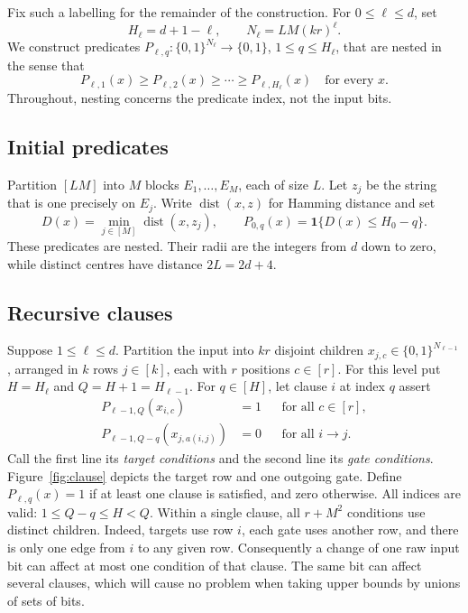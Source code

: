 \documentclass[11pt]{article}
\theoremstyle{definition}
\theoremstyle{remark}
\begin{document}
Fix such a labelling for the remainder of the construction.
For \(0\le\ell\le d\), set
\[
 H_\ell=d+1-\ell,\qquad N_\ell=LM(kr)^\ell.
\]
We construct predicates \(P_{\ell,q}:\{0,1\}^{N_\ell}\to\{0,1\}\),
\(1\le q\le H_\ell\), that are nested in the sense that
\[
 P_{\ell,1}(x)\ge P_{\ell,2}(x)\ge\cdots
 \ge P_{\ell,H_\ell}(x)\quad\text{for every }x.
\]
Throughout, nesting concerns the predicate index, not the input bits.

\subsection{Initial predicates}
Partition \([LM]\) into \(M\) blocks \(E_1,\ldots,E_M\), each of
size \(L\). Let \(z_j\) be the string that is one precisely on \(E_j\).
Write \(\operatorname{dist}(x,z)\) for Hamming distance and set
\[
 D(x)=\min_{j\in[M]}\operatorname{dist}(x,z_j),\qquad
 P_{0,q}(x)=\mathbf1\{D(x)\le H_0-q\}.
\]
These predicates are nested. Their radii are the integers from \(d\)
down to zero, while distinct centres have distance \(2L=2d+4\).

\subsection{Recursive clauses}
Suppose \(1\le\ell\le d\). Partition the input into \(kr\) disjoint
children \(x_{j,c}\in\{0,1\}^{N_{\ell-1}}\), arranged in \(k\) rows
\(j\in[k]\), each with \(r\) positions \(c\in[r]\).
For this level put \(H=H_\ell\) and \(Q=H+1=H_{\ell-1}\).
For \(q\in[H]\), let clause \(i\) at index \(q\) assert
\begin{equation}\label{eq:predicate-definition}
 \begin{aligned}
 P_{\ell-1,Q}(x_{i,c})&=1 &&\text{for all }c\in[r],\\
 P_{\ell-1,Q-q}(x_{j,a(i,j)})&=0 &&\text{for all }i\to j.
 \end{aligned}
\end{equation}
Call the first line its \emph{target conditions} and the second line
its \emph{gate conditions}. Figure~\ref{fig:clause} depicts the target row
and one outgoing gate. Define \(P_{\ell,q}(x)=1\) if at least
one clause is satisfied, and zero otherwise. All indices are valid:
\(1\le Q-q\le H<Q\).
Within a single clause, all \(r+M^2\) conditions use distinct children.
Indeed, targets use row \(i\), each gate uses another row, and there
is only one edge from \(i\) to any given row. Consequently a change
of one raw input bit can affect at most one condition of that clause.
The same bit can affect several clauses, which will cause no problem
when taking upper bounds by unions of sets of bits.
\end{document}
